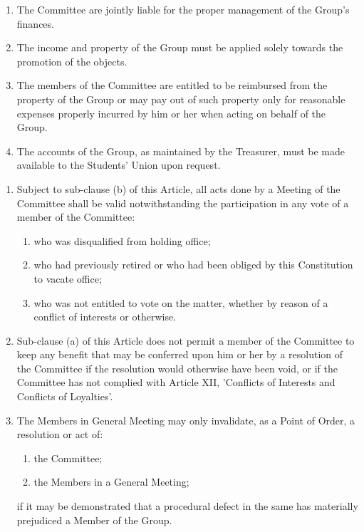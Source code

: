\documentclass[12pt]{constitution}
\begin{document}

\begin{enumerate}
    \item The Committee are jointly liable for the proper management of the Group's finances.
    \item The income and property of the Group must be applied solely towards the promotion of the objects.
    \item The members of the Committee are entitled to be reimbursed from the property of the Group or may pay out of such property only for reasonable expenses properly incurred by him or her when acting on behalf of the Group.
    \item The accounts of the Group, as maintained by the Treasurer, must be made available to the Students' Union upon request.
\end{enumerate}



\begin{enumerate}
    \item Subject to sub-clause (b) of this Article, all acts done by a Meeting of the Committee shall be valid notwithstanding the participation in any vote of a member of the Committee:
    \begin{enumerate}
        \item who was disqualified from holding office;
        \item who had previously retired or who had been obliged by this Constitution to vacate office;
        \item who was not entitled to vote on the matter, whether by reason of a conflict of interests or otherwise.
    \end{enumerate}

\item Sub-clause (a) of this Article does not permit a member of the Committee to keep any benefit that may be conferred upon him or her by a resolution of the Committee if the resolution would otherwise have been void, or if the Committee has not complied with Article XII, 'Conflicts of Interests and Conflicts of Loyalties'.
    \item The Members in General Meeting may only invalidate, as a Point of Order, a resolution or act of:
    \begin{enumerate}
        \item the Committee;
        \item the Members in a General Meeting;
    \end{enumerate}
    if it may be demonstrated that a procedural defect in the same has materially prejudiced a Member of the Group.
\end{enumerate}
\end{document}
